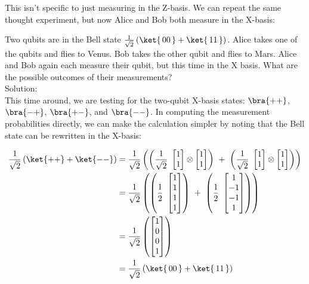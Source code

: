 \documentclass{article}
\newcommand{\soln}{{\\[1em] \hspace{-1em}\color{greentitle}\sffamily\large Solution: \\[0.5em]}}
\theoremstyle{definition}
\newcommand{\kz}[1]{\ket{\,#1\,}}
\newcommand{\kx}[1]{\ket{#1}}
\newcommand{\bx}[1]{\bra{#1}}
\begin{document}
This isn't specific to just measuring in the Z-basis.  We can repeat the same thought experiment, but now Alice and Bob both measure in the X-basis:
\begin{example} \label{ex:bellmeasxx}
	Two qubits are in the Bell state $\frac{1}{\sqrt{2}} \left(\kz{00} + \kz{11}\right)$.  Alice takes one of the qubits and flies to Venus.  Bob takes the other qubit and flies to Mars.  Alice and Bob again each measure their qubit, but this time in the X basis.  What are the possible outcomes of their measurements?
	\soln \textnormal{This time around, we are testing for the two-qubit X-basis states: $\bx{++}$, $\bx{-+}$, $\bx{+-}$, and $\bx{--}$.  In computing the measurement probabilities directly, we can make the calculation simpler by noting that the Bell state can be rewritten in the X-basis:}

	\begin{align}
		\frac{1}{\sqrt{2}} \left(\kx{++} + \kx{--}\right) &= \frac{1}{\sqrt{2}} \left(\left(\frac{1}{\sqrt{2}} \ \begin{bmatrix}
			1\\ 1
		\end{bmatrix} \otimes \begin{bmatrix}
			1\\ 1
		\end{bmatrix}\right) \ + \ \left(\frac{1}{\sqrt{2}} \ \begin{bmatrix}
			1\\ 1
		\end{bmatrix} \otimes \begin{bmatrix}
			1\\ 1
		\end{bmatrix}\right)\right)\\
		&= \frac{1}{\sqrt{2}} \left(\left(\frac{1}{2} \ \begin{bmatrix}
			1\\ 1\\ 1\\ 1\end{bmatrix}\right) \ + \ \left(\frac{1}{2} \ \begin{bmatrix}
				1\\ -1\\ -1\\ 1\end{bmatrix}\right)\right)\\
		&= \frac{1}{\sqrt{2}} \left(\begin{bmatrix}
			1\\ 0\\ 0\\ 1
		\end{bmatrix}\right)\\
		&= \frac{1}{\sqrt{2}} \left(\kz{00} + \kz{11}\right)
	\end{align}


\end{example}
\end{document}
